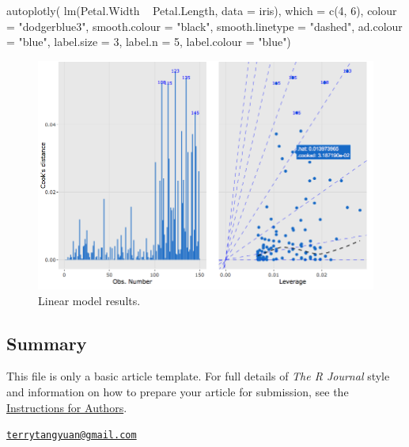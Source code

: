 \begin{Schunk}
\begin{Sinput}
autoplotly(
  lm(Petal.Width ~ Petal.Length, data = iris),
  which = c(4, 6), colour = "dodgerblue3",
  smooth.colour = "black", smooth.linetype = "dashed",
  ad.colour = "blue", label.size = 3, label.n = 5,
  label.colour = "blue")
\end{Sinput}
\end{Schunk}

\begin{figure}[htbp]
  \centering
  \includegraphics[width=145mm,scale=0.8]{images/lm_caption.png}
  \caption{Linear model results.}
  \label{figure:lm_caption}
\end{figure}

\subsection{Summary}\label{summary}

This file is only a basic article template. For full details of
\emph{The R Journal} style and information on how to prepare your
article for submission, see the
\href{https://journal.r-project.org/share/author-guide.pdf}{Instructions
for Authors}. 

\address{%
Yuan Tang\\
H2O.ai\\
2309 Wake Robin Drive\\ West Lafayette, IN 47906\\
}
\href{mailto:terrytangyuan@gmail.com}{\nolinkurl{terrytangyuan@gmail.com}}

